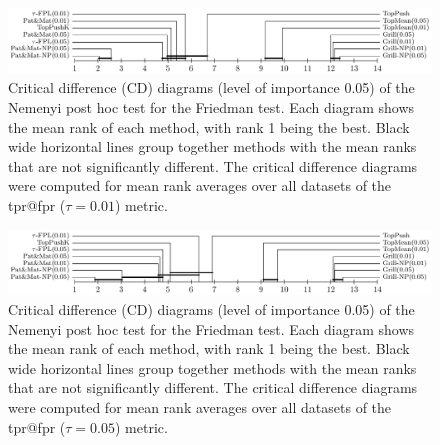 \begin{figure}[!ht]
  \centering
  \includegraphics[width = \linewidth]{images/crit_diag_fpr_1.pdf}
  \caption{Critical difference (CD) diagrams (level of importance 0.05) of the Nemenyi post hoc test for the Friedman test. Each diagram shows the mean rank of each method, with rank 1 being the best. Black wide horizontal lines group together methods with the mean ranks that are not significantly different. The critical difference diagrams were computed for mean rank averages over all datasets of the tpr@fpr ($\tau=0.01$) metric.}
  \label{fig:cd1}
\end{figure}

\begin{figure}[!ht]
  \centering
  \includegraphics[width = \linewidth]{images/crit_diag_fpr_5.pdf}
  \caption{Critical difference (CD) diagrams (level of importance 0.05) of the Nemenyi post hoc test for the Friedman test. Each diagram shows the mean rank of each method, with rank 1 being the best. Black wide horizontal lines group together methods with the mean ranks that are not significantly different. The critical difference diagrams were computed for mean rank averages over all datasets of the tpr@fpr ($\tau=0.05$) metric.}
  \label{fig:cd2}
\end{figure}

